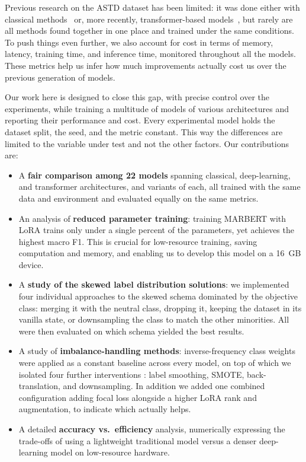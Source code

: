 \documentclass[conference]{IEEEtran}
\begin{document}
Previous research on the ASTD dataset has been limited: it was done either with classical methods~\cite{nabil2015astd}
or, more recently, transformer-based models~\cite{antoun2020arabert,abdulmageed2021marbert}, but rarely are all methods
found together in one place and trained under the same conditions. To push things even further, we also
account for cost in terms of memory, latency, training time, and inference time, monitored throughout all the models.
These metrics help us infer how much improvements actually cost us over the previous generation of models.

Our work here is designed to close this gap, with precise control over the experiments,
while training a multitude of models of various architectures and reporting their performance and cost.
Every experimental model holds the dataset split, the seed, and the metric constant. This way the differences are
limited to the variable under test and not the other factors. Our contributions are:

\begin{itemize}
  \item A \textbf{fair comparison among 22 models} spanning classical, deep-learning,
        and transformer architectures, and variants of each, all trained with the same data
        and environment and evaluated equally on the same metrics.
  \item An analysis of \textbf{reduced parameter training}: training MARBERT with LoRA
        trains only under a single percent of the parameters, yet achieves the highest macro F1.
        This is crucial for low-resource training, saving computation and memory, and
        enabling us to develop this model on a 16~GB device.
  \item A \textbf{study of the skewed label distribution solutions}: we implemented four individual
        approaches to the skewed schema dominated by the objective class: merging it with
        the neutral class, dropping it, keeping the dataset in its vanilla state, or downsampling the
        class to match the other minorities. All were then evaluated on which schema yielded the best results.
  \item A study of \textbf{imbalance-handling methods}: inverse-frequency class weights
        were applied as a constant baseline across every model, on top of which we
        isolated four further interventions : label smoothing, SMOTE, back-translation,
        and downsampling. In addition we added one combined configuration adding focal loss alongside
        a higher LoRA rank and augmentation, to indicate which actually helps.
  \item A detailed \textbf{accuracy vs.\ efficiency} analysis, numerically expressing
        the trade-offs of using a lightweight traditional model versus a denser deep-learning model
        on low-resource hardware. 
\end{itemize}
\end{document}
